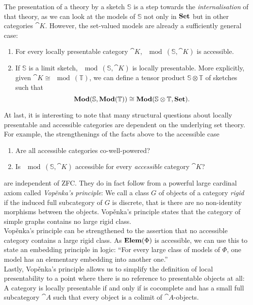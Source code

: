 The presentation of a theory by a sketch $\mathbb S$ is a step towards the \emph{internalisation} of that theory, as we can look at the models of $\mathbb S$ not only in $\mathbf{Set}$ but in other categories $\cat K$. However, the set-valued models are already a sufficiently general case:
\begin{enumerate}[resume]
\item For every locally presentable category $\cat K$, $\mod(\mathbb S, \cat K)$ is accessible.
\item If $\mathbb S$ is a limit sketch, $\mod(\mathbb S, \cat K)$ is locally presentable. More explicitly, given $\cat K \cong \mod(\mathbb T)$, we can define a tensor product $\mathbb S \otimes \mathbb T$ of sketches such that 
\[ \mathbf{Mod}(\mathbb S, \mathbf{Mod}(\mathbb T)) \cong \mathbf{Mod}(\mathbb S \otimes \mathbb T, \mathbf{Set}). \] 
\end{enumerate}

At last, it is interesting to note that many structural questions about locally presentable and accessible categories are dependent on the underlying set theory. For example, the strengthenings of the facts above to the accessible case

\begin{enumerate}[resume]
\item Are all accessible categories co-well-powered?
\item Is $\mod(\mathbb S, \cat K)$ accessible for every \emph{accessible} category $\cat K$?
\end{enumerate} 

are independent of ZFC. They do in fact follow from a powerful large cardinal axiom called \emph{Vopěnka's principle}: We call a class $G$ of objects of a category \emph{rigid} if the induced full subcategory of $G$ is discrete, that is there are no non-identity morphisms between the objects. Vopěnka's principle states that the category of simple graphs contains no large rigid class. \\

Vopěnka's principle can be strengthened to the assertion that no accessible category contains a large rigid class. As $\mathbf{Elem}(\Phi)$ is accessible, we can use this to state an embedding principle in logic: ``For every large class of models of $\Phi$, one model has an elementary embedding into another one.'' \\

Lastly, Vopěnka's principle allows us to simplify the definition of local presentability to a point where there is no reference to presentable objects at all: A category is locally presentable if and only if is cocomplete and has a small full subcategory $\cat A$ such that every object is a colimit of $\cat A$-objects.